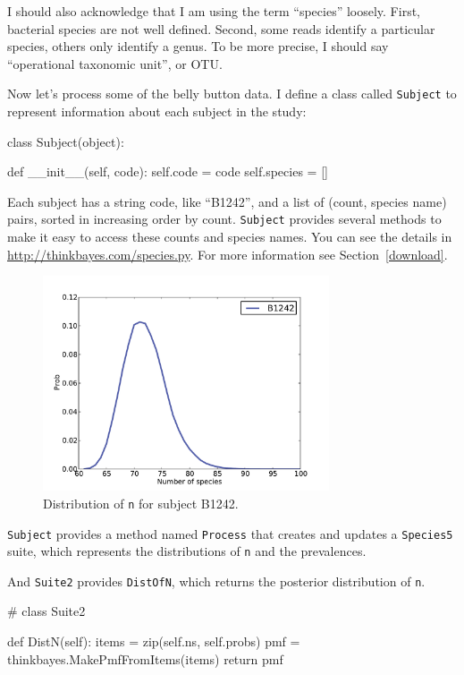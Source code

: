 \documentclass[12pt]{book}
\theoremstyle{exercise}
\begin{document}
I should also acknowledge that I am using the term ``species''
loosely.  First, bacterial species are not well defined.  Second,
some reads identify a particular species, others only identify
a genus.  To be more precise, I should say ``operational
taxonomic unit'', or OTU.

Now let's process some of the belly button data.  I define
a class called {\tt Subject} to represent information about
each subject in the study:

\begin{code}
class Subject(object):

    def __init__(self, code):
        self.code = code
        self.species = []
\end{code}

Each subject has a string code, like ``B1242'', and a list of
(count, species name) pairs, sorted in increasing order by count.
{\tt Subject} provides several methods to make it
easy to access these counts and species names.  You can see the details
in \url{http://thinkbayes.com/species.py}.
  For more information
see Section~\ref{download}.

\begin{figure}
\centerline{\includegraphics[height=2.5in]{figs/species-ndist-B1242.pdf}}
\caption{Distribution of {\tt n} for subject B1242.}
\label{species-ndist}
\end{figure}

{\tt Subject} provides a method named {\tt Process} that creates and
updates a {\tt Species5} suite,
which represents the distributions of {\tt n} and the prevalences.

And {\tt Suite2} provides {\tt DistOfN}, which returns the posterior
distribution of {\tt n}.

\begin{code}
# class Suite2

    def DistN(self):
        items = zip(self.ns, self.probs)
        pmf = thinkbayes.MakePmfFromItems(items)
        return pmf
\end{code}
\end{document}
